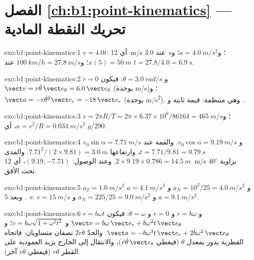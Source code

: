 \section*{الفصل \ref{ch:b1:point-kinematics} --- تحريك النقطة المادية}

\begin{solution}{exo:b1:point-kinematics:1}
$v = 4.0t$: أي \qty{12}{m/s} عند \qty{3.0}{s}؛ و$a = \qty{4.0}{m/s^2}$؛
و$x(5) = \qty{50}{m}$؛ و$\qty{100}{km/h} = \qty{27.8}{m/s}$ عند $t = 27.8/4.0
= \qty{6.9}{s}$.
\end{solution}

\begin{solution}{exo:b1:point-kinematics:2}
$\dot r = 0$ و $\dot\theta = \qty{3.0}{rad/s}$: فيكون $\vect v = r\dot\theta\,\vect e_\theta
= 6.0\,\vect e_\theta$ (بوحدة \unit{m/s})؛ و $\vect a = -r\dot\theta^2\vect e_r =
-18\,\vect e_r$ (بوحدة \unit{m/s^2}). وهي  منتظمة: قيمة  ثابتة و
.
\end{solution}

\begin{solution}{exo:b1:point-kinematics:3}
$v = 2\pi R/T = 2\pi \times 6.37\times10^6/86164 = \qty{465}{m/s}$؛
و$a = v^2/R = \qty{0.034}{m/s^2}$، أي $g/290$.
\end{solution}

\begin{solution}{exo:b1:point-kinematics:4}
$v_0\sin\alpha = \qty{7.71}{m/s}$ و $v_0\cos\alpha = \qty{9.19}{m/s}$.
والقمة عند $t = 7.71/9.81 = \qty{0.79}{s}$، وارتفاعها $7.71^2/(2 \times 9.81) =
\qty{3.0}{m}$. والمدى $2 \times 9.19 \times 0.786 = \qty{14.5}{m}$.
وعند الوصول: $(9.19, -7.71)$، أي \qty{12}{m/s} بزاوية $40^\circ$ تحت
الأفق.
\end{solution}

\begin{solution}{exo:b1:point-kinematics:5}
$a_T = \qty{1.0}{m/s^2}$ و $a_N = 10^2/25 = \qty{4.0}{m/s^2}$ و $a =
\qty{4.1}{m/s^2}$. وبعد \qty{5}{s}: $v = \qty{15}{m/s}$ و $a_N = 225/25 =
\qty{9.0}{m/s^2}$ و $a = \qty{9.1}{m/s^2}$.
\end{solution}

\begin{solution}{exo:b1:point-kinematics:6}
$r = b\omega t$ و $\dot r = b\omega$ و $\ddot r = 0$ و $\dot\theta = \omega$:
فيكون $\vect v = b\omega\,\vect e_r + b\omega^2 t\,\vect e_\theta$ و $v = b\omega
\sqrt{1 + \omega^2t^2}$؛ و $\vect a = -b\omega^3 t\,\vect e_r + 2b\omega^2\,
\vect e_\theta$. والحدّ $2\dot r\dot\theta$ نصفان متساويان: فاتجاه
 القطرية يدور بمعدل $\dot\theta$ (فيعطي
$\dot r\dot\theta\,\vect e_\theta$)، والانتقال إلى الخارج يزيد
 العمودية على القطر $r\dot\theta$ (فيعطي $\dot r\dot\theta$ آخر).
\end{solution}

